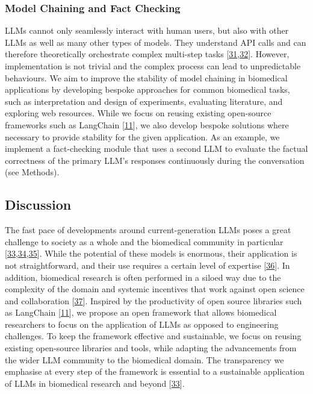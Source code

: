 \hypertarget{model-chaining-and-fact-checking}{%
\subsubsection{Model Chaining and Fact Checking}\label{model-chaining-and-fact-checking}}

LLMs cannot only seamlessly interact with human users, but also with other LLMs as well as many other types of models.
They understand API calls and can therefore theoretically orchestrate complex multi-step tasks {[}\protect\hyperlink{ref-hHuKg12k}{31},\protect\hyperlink{ref-lmJHElQl}{32}{]}.
However, implementation is not trivial and the complex process can lead to unpredictable behaviours.
We aim to improve the stability of model chaining in biomedical applications by developing bespoke approaches for common biomedical tasks, such as interpretation and design of experiments, evaluating literature, and exploring web resources.
While we focus on reusing existing open-source frameworks such as LangChain {[}\protect\hyperlink{ref-UEmjXz02}{11}{]}, we also develop bespoke solutions where necessary to provide stability for the given application.
As an example, we implement a fact-checking module that uses a second LLM to evaluate the factual correctness of the primary LLM's responses continuously during the conversation (see Methods).

\hypertarget{discussion}{%
\subsection{Discussion}\label{discussion}}

The fast pace of developments around current-generation LLMs poses a great challenge to society as a whole and the biomedical community in particular {[}\protect\hyperlink{ref-BXdkfGlr}{33},\protect\hyperlink{ref-3cvgHyjq}{34},\protect\hyperlink{ref-kWGPJCV0}{35}{]}.
While the potential of these models is enormous, their application is not straightforward, and their use requires a certain level of expertise {[}\protect\hyperlink{ref-TeDQ9cuh}{36}{]}.
In addition, biomedical research is often performed in a siloed way due to the complexity of the domain and systemic incentives that work against open science and collaboration {[}\protect\hyperlink{ref-JKZeMkVq}{37}{]}.
Inspired by the productivity of open source libraries such as LangChain {[}\protect\hyperlink{ref-UEmjXz02}{11}{]}, we propose an open framework that allows biomedical researchers to focus on the application of LLMs as opposed to engineering challenges.
To keep the framework effective and sustainable, we focus on reusing existing open-source libraries and tools, while adapting the advancements from the wider LLM community to the biomedical domain.
The transparency we emphasise at every step of the framework is essential to a sustainable application of LLMs in biomedical research and beyond {[}\protect\hyperlink{ref-BXdkfGlr}{33}{]}.

